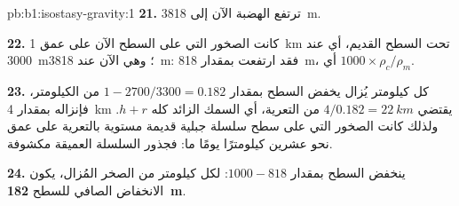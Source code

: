 \begin{solution}{pb:b1:isostasy-gravity:1}
\textbf{21.} ترتفع الهضبة الآن إلى \qty{3818}{m}.

\textbf{22.} كانت الصخور التي على السطح الآن على عمق \qty{1}{km} تحت السطح القديم، أي عند \qty{3000}{m}؛ وهي الآن عند \qty{3818}{m}: فقد ارتفعت بمقدار \qty{818}{m}، أي $1000\times\rho_c/\rho_m$.

\textbf{23.} كل كيلومتر يُزال يخفض السطح بمقدار $1 - 2700/3300 =
0.182$ من الكيلومتر، فإنزاله بمقدار \qty{4}{km} يقتضي
$4/0.182 = \qty{22}{km}$ من التعرية، أي السمك الزائد كله $h + r$. ولذلك كانت الصخور التي على سطح سلسلة جبلية قديمة مستوية بالتعرية على عمق نحو عشرين كيلومترًا يومًا ما: فجذور السلسلة العميقة مكشوفة.

\textbf{24.} ينخفض السطح بمقدار $1000 - 818$: لكل كيلومتر من الصخر المُزال، يكون الانخفاض الصافي للسطح
\textbf{\qty[text-series-to-math=true]{182}{m}}.
\end{solution}
